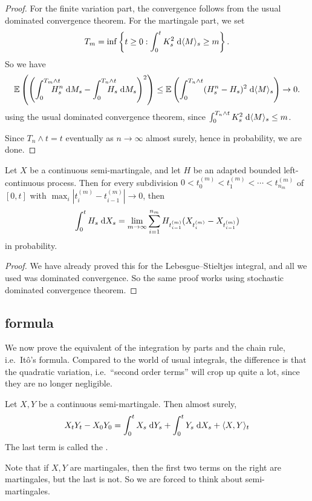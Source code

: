 \documentclass[a4paper]{article}
\begin{document}
\begin{proof}
  For the finite variation part, the convergence follows from the usual dominated convergence theorem. For the martingale part, we set
  \[
    T_m = \inf \left\{t \geq 0: \int_0^t K_s^2 \;\mathrm{d} \langle M\rangle_s \geq m\right\}.
  \]
  So we have
  \[
    \E \left(\left(\int_0^{T_m \wedge t}\hspace{-13pt}H_s^n \;\d M_s - \int_0^{T_n \wedge t}\hspace{-13pt}H_s\;\d M_s\right)^2\right) \leq \E \left(\int_0^{T_n \wedge t}\vspace{-13pt}(H_s^n- H_s)^2 \;\d \bra M\ket_s\right) \to 0.
  \]
  using the usual dominated convergence theorem, since $\int_0^{T_n \wedge t} K_s^2 \;\mathrm{d} \langle M\rangle_s \leq m$.

  Since $T_n \wedge t = t$ eventually as $n \to \infty$ almost surely, hence in probability, we are done.
\end{proof}

\begin{prop}
  Let $X$ be a continuous semi-martingale, and let $H$ be an adapted bounded left-continuous process. Then for every subdivision $0 < t_0^{(m)} < t_1^{(m)} < \cdots < t_{n_m}^{(m)}$ of $[0, t]$ with $\max_i |t_i^{(m)} - t_{i - 1}^{(m)}| \to 0$, then
  \[
    \int_0^t H_s \;\mathrm{d} X_s = \lim_{m \to \infty} \sum_{i = 1}^{n_m} H_{t_{i - 1}^{(m)}} (X_{t_i^{(m)}} - X_{t_{i - 1}^{(m)}})
  \]
  in probability.
\end{prop}

\begin{proof}
  We have already proved this for the Lebesgue--Stieltjes integral, and all we used was dominated convergence. So the same proof works using stochastic dominated convergence theorem.
\end{proof}

\subsection{ formula}
We now prove the equivalent of the integration by parts and the chain rule, i.e.\ It\^o's formula. Compared to the world of usual integrals, the difference is that the quadratic variation, i.e.\ ``second order terms'' will crop up quite a lot, since they are no longer negligible.

\begin{thm}
  Let $X, Y$ be a continuous semi-martingale. Then almost surely,
  \[
    X_t Y_t - X_0 Y_0 = \int_0^t X_s \;\mathrm{d} Y_s + \int_0^t Y_s\;\mathrm{d} X_s + \langle X, Y\rangle_t
  \]
  The last term is called the .
\end{thm}
Note that if $X, Y$ are martingales, then the first two terms on the right are martingales, but the last is not. So we are forced to think about semi-martingales.
\end{document}
